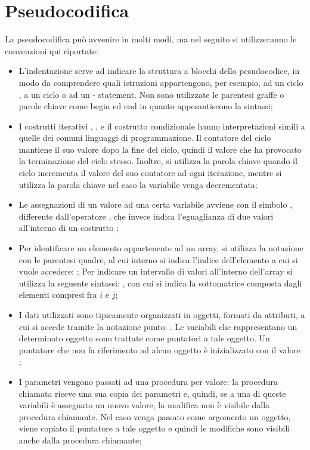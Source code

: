 \section{Pseudocodifica}
La pseudocodifica può avvenire in molti modi, ma nel seguito si utilizzeranno le convenzioni qui riportate:
\begin{itemize}
  \item L'indentazione serve ad indicare la struttura a blocchi dello pesudocodice, in modo da comprendere quali istruzioni appartengono, per esempio, ad un ciclo , a un ciclo  o ad un - statement. Non sono utilizzate le parentesi graffe o parole chiave come begin ed end in quanto appesantiscono la sintassi;
  \item I costrutti iterativi , ,  e il costrutto condizionale  hanno interpretazioni simili a quelle dei comuni linguaggi di programmazione. Il contatore del ciclo mantiene il suo valore dopo la fine del ciclo, quindi il valore che ha provocato la terminazione del ciclo stesso. Inoltre, si utilizza la parola chiave  quando il ciclo  incrementa il valore del suo contatore ad ogni iterazione, mentre si utilizza la parola chiave  nel caso la variabile venga decrementata;
  \item Le assegnazioni di un valore ad una certa variabile avviene con il simbolo \code{:=}, differente dall'operatore \code{=}, che invece indica l'eguaglianza di due valori all'interno di un costrutto ;
  \item Per identificare un elemento appartenente ad un array, si utilizza la notazione con le parentesi quadre, al cui interno si indica l'indice dell'elemento a cui si vuole accedere: ; Per indicare un intervallo di valori all'interno dell'array si utilizza la seguente sintassi: , con cui si indica la sottomatrice composta dagli elementi compresi fra \(i\) e \(j\); 
  \item I dati utilizzati sono tipicamente organizzati in oggetti, formati da attributi, a cui si accede tramite la notazione punto: . Le variabili che rappresentano un determinato oggetto sono trattate come puntatori a tale oggetto. Un puntatore che non fa riferimento ad alcun oggetto è inizializzato con il valore ;
  \item I parametri vengono passati ad una procedura per valore: la procedura chiamata riceve una sua copia dei parametri e, quindi, se a una di queste variabili è assegnato un nuovo valore, la modifica non è visibile dalla procedura chiamante. Nel caso venga passato come argomento un oggetto, viene copiato il puntatore a tale oggetto e quindi le modifiche sono visibili anche dalla procedura chiamante;

\end{itemize}
